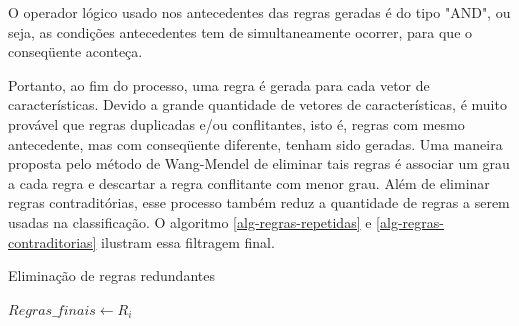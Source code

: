 \documentclass[template.tex]{subfiles}
\begin{document}



O operador lógico usado nos antecedentes das regras geradas é do tipo "AND", ou seja, as condições antecedentes tem de simultaneamente ocorrer, para que o conseqüente aconteça.

Portanto, ao fim do processo, uma regra é gerada para cada vetor de características. Devido a grande quantidade de vetores de características, é muito provável que regras duplicadas e/ou conflitantes, isto é, regras com mesmo antecedente, mas com conseqüente diferente, tenham sido geradas. Uma maneira proposta pelo método de Wang-Mendel de eliminar tais regras é associar um grau a cada regra e descartar a regra conflitante com menor grau. Além de eliminar regras contraditórias, esse processo também reduz a quantidade de regras a serem usadas na classificação. O algoritmo \ref{alg-regras-repetidas} e \ref{alg-regras-contraditorias} ilustram essa filtragem final.

\begin{algorithm}
\begin{algorithmic}[1]
\caption{Eliminação de regras redundantes}
\label{alg-regras-repetidas}
           \STATE $Regras\_finais \leftarrow R_i$
       \ENDIF    
   \ENDFOR
\ENDFOR
\end{algorithmic}
\end{algorithm}
\end{document}
